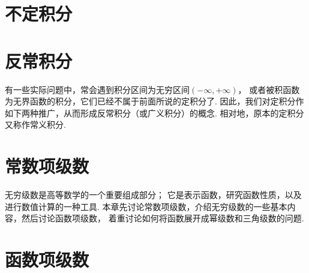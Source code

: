 \chapter{不定积分}\label{chapter:不定积分}








\chapter{反常积分}
有一些实际问题中，常会遇到积分区间为无穷区间\((-\infty,+\infty)\)，
或者被积函数为无界函数的积分，它们已经不属于前面所说的定积分了.
因此，我们对定积分作如下两种推广，从而形成反常积分（或广义积分）的概念.
相对地，原本的定积分又称作常义积分.










\chapter{常数项级数}
无穷级数是高等数学的一个重要组成部分；
它是表示函数，研究函数性质，以及进行数值计算的一种工具.
本章先讨论常数项级数，介绍无穷级数的一些基本内容，然后讨论函数项级数，
着重讨论如何将函数展开成幂级数和三角级数的问题.




\chapter{函数项级数}











